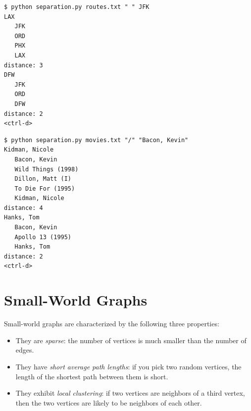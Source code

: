 \documentclass[8pt,a4paper,compress,handout]{beamer}
\begin{document}
\begin{frame}[fragile]
\begin{lstlisting}[language={}]
$ python separation.py routes.txt " " JFK
LAX   
   JFK
   ORD
   PHX
   LAX
distance: 3
DFW
   JFK
   ORD
   DFW
distance: 2
<ctrl-d>
\end{lstlisting}

\begin{lstlisting}[language={}]
$ python separation.py movies.txt "/" "Bacon, Kevin"
Kidman, Nicole
   Bacon, Kevin
   Wild Things (1998)
   Dillon, Matt (I)
   To Die For (1995)
   Kidman, Nicole
distance: 4
Hanks, Tom
   Bacon, Kevin
   Apollo 13 (1995)
   Hanks, Tom
distance: 2
<ctrl-d>
\end{lstlisting}
\end{frame}

\section{Small-World Graphs}
\begin{frame}[fragile]
Small-world graphs are characterized by the following three properties:

\begin{itemize}
\item They are \emph{sparse}: the number of vertices is much smaller than the number of edges.

\item They have \emph{short average path lengths}: if you pick two random vertices, the length of the shortest path between them is short.

\item They exhibit \emph{local clustering}: if two vertices are neighbors of a third vertex, then the two vertices are likely to be neighbors of each other.
\end{itemize}
\end{frame}
\end{document}
